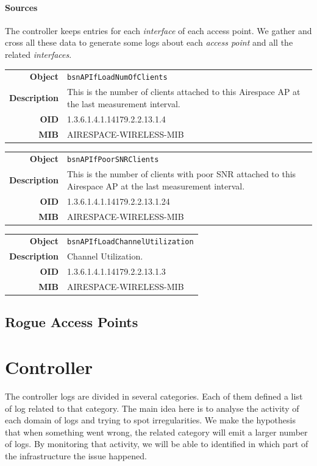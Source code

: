 \paragraph*{Sources} The controller keeps entries for each \emph{interface} of each access point. We gather and cross all these data to generate some logs about each \emph{access point} and all the related \emph{interfaces}.

\begin{tabular}{|r l|}
\hline
\textbf{Object} & \texttt{bsnAPIfLoadNumOfClients} \\
\textbf{Description} & \parbox{11cm}{This is the number of clients attached to this Airespace AP at the last measurement interval.} \\
\textbf{OID} & 1.3.6.1.4.1.14179.2.2.13.1.4 \\
\textbf{MIB} & AIRESPACE-WIRELESS-MIB \\
\hline
\end{tabular}

\begin{tabular}{|r l|}
\hline
\textbf{Object} & \texttt{bsnAPIfPoorSNRClients} \\
\textbf{Description} & \parbox{11cm}{This is the number of clients with poor SNR attached to this Airespace AP at the last measurement interval.} \\
\textbf{OID} & 1.3.6.1.4.1.14179.2.2.13.1.24 \\
\textbf{MIB} & AIRESPACE-WIRELESS-MIB \\
\hline
\end{tabular}

\begin{tabular}{|r l|}
\hline
\textbf{Object} & \texttt{bsnAPIfLoadChannelUtilization} \\
\textbf{Description} & \parbox{11cm}{Channel Utilization.} \\
\textbf{OID} & 1.3.6.1.4.1.14179.2.2.13.1.3 \\
\textbf{MIB} & AIRESPACE-WIRELESS-MIB \\
\hline
\end{tabular}



\subsection{Rogue Access Points}

\section{Controller}
The controller logs are divided in several categories. Each of them defined a list of log related to that category. The main idea here is to analyse the activity of each domain of logs and trying to spot irregularities. We make the hypothesis that when something went wrong, the related category will emit a larger number of logs. By monitoring that activity, we will be able to identified in which part of the infrastructure the issue happened.

